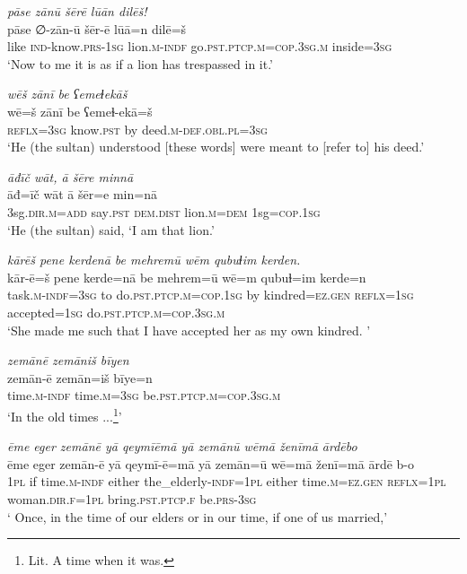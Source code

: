 \ea \label{ŽH.114}
\textit{pāse zānū šērē lūān dilēš!} \\ 
\gll pāse ∅-zān-ū šēr-ē lūā=n dilē=š \\ 
 like \textsc{ind-}know\textsc{.prs}\textsc{-1sg} lion\textsc{.m}\textsc{-indf} go\textsc{.pst}\textsc{.ptcp}\textsc{.m}\textsc{=cop}\textsc{.3sg}\textsc{.m} inside\textsc{=3sg} \\ 
\glt `Now to me it is as if a lion has trespassed in it.'
\z 
 
\ea \label{ŽH.115}
\textit{wēš zānī be ʕemeɫekāš} \\ 
\gll wē=š zānī be ʕemeɫ-ekā=š \\ 
 \textsc{reflx}\textsc{=3sg} know\textsc{.pst} by deed\textsc{.m}\textsc{-def}\textsc{.obl}\textsc{.pl}\textsc{=3sg} \\ 
\glt `He (the sultan) understood [these words] were meant to [refer to] his deed.'
\z 
 
\ea \label{ŽH.116}
\textit{āđīč wāt, ā šēre minnā} \\ 
\gll āđ=īč wāt ā šēr=e min=nā \\ 
 3sg\textsc{.dir}\textsc{.m}\textsc{=add} say\textsc{.pst} \textsc{dem.dist} lion\textsc{.m}\textsc{=dem} 1sg\textsc{=cop}\textsc{.1sg} \\ 
\glt `He (the sultan) said, ‘I am that lion.'
\z 
 
\ea \label{ŽH.117}
\textit{kārēš pene kerdenā be mehremū wēm qubuɫim kerden.} \\ 
\gll kār-ē=š pene kerde=nā be mehrem=ū wē=m qubuɫ=im kerde=n \\ 
 task\textsc{.m}\textsc{-indf}\textsc{=3sg} to do\textsc{.pst}\textsc{.ptcp}\textsc{.m}\textsc{=cop}\textsc{.1sg} by kindred\textsc{=ez}\textsc{.gen} \textsc{reflx}\textsc{=1sg} accepted\textsc{=1sg} do\textsc{.pst}\textsc{.ptcp}\textsc{.m}\textsc{=cop}\textsc{.3sg}\textsc{.m} \\ 
\glt `She made  me such that I have accepted her as my own kindred. '
\z 
 
\ea \label{RE.1}
\textit{zemānē zemāniš bīyen} \\ 
\gll zemān-ē zemān=iš bīye=n \\ 
 time\textsc{.m}\textsc{-indf} time\textsc{.m}\textsc{=3sg} be\textsc{.pst}\textsc{.ptcp}\textsc{.m}\textsc{=cop}\textsc{.3sg}\textsc{.m} \\ 
\glt `In the old times ...\footnote{Lit. A time when it was.}'
\z 
 
\ea \label{RE.2}
\textit{ēme eger zemānē yā qeymīēmā yā zemānū wēmā ženīmā ārdēbo} \\ 
\gll ēme eger zemān-ē yā qeymī-ē=mā yā zemān=ū wē=mā ženī=mā ārdē b-o \\ 
 \textsc{1pl} if time\textsc{.m}\textsc{-indf} either the\_elderly\textsc{-indf}\textsc{=\textsc{1pl}} either time\textsc{.m}\textsc{\textsc{=ez.gen}} \textsc{reflx}\textsc{=\textsc{1pl}} woman\textsc{.dir}\textsc{.f}\textsc{=\textsc{1pl}} bring\textsc{.pst}\textsc{.ptcp}\textsc{.f} be\textsc{.prs}\textsc{-3sg} \\ 
\glt ` Once, in the time of our elders or in our time, if one of us married,'
\z 
 
